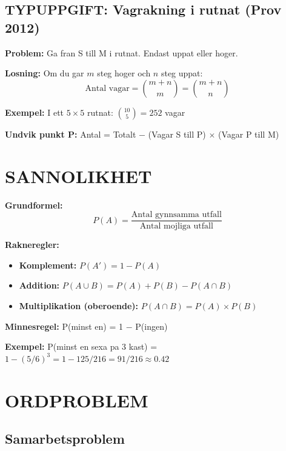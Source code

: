 \documentclass[11pt,a4paper]{article}
\newenvironment{formelbox}{\begin{framed}\color{mainblue}}{\end{framed}}
\begin{document}
\subsection{TYPUPPGIFT: Vagrakning i rutnat (Prov 2012)}

\textbf{Problem:} Ga fran S till M i rutnat. Endast uppat eller hoger.

\begin{formelbox}
\textbf{Losning:} Om du gar $m$ steg hoger och $n$ steg uppat:
\[ \text{Antal vagar} = \binom{m+n}{m} = \binom{m+n}{n} \]
\end{formelbox}

\textbf{Exempel:} I ett $5 \times 5$ rutnat: $\binom{10}{5} = 252$ vagar

\textbf{Undvik punkt P:} Antal = Totalt $-$ (Vagar S till P) $\times$ (Vagar P till M)

\section{SANNOLIKHET}

\begin{formelbox}
\textbf{Grundformel:}
\[ P(A) = \frac{\text{Antal gynnsamma utfall}}{\text{Antal mojliga utfall}} \]
\end{formelbox}

\textbf{Rakneregler:}
\begin{itemize}
\item \textbf{Komplement:} $P(A') = 1 - P(A)$
\item \textbf{Addition:} $P(A \cup B) = P(A) + P(B) - P(A \cap B)$
\item \textbf{Multiplikation (oberoende):} $P(A \cap B) = P(A) \times P(B)$
\end{itemize}

\begin{formelbox}
\textbf{Minnesregel:} P(minst en) = 1 $-$ P(ingen)
\end{formelbox}

\textbf{Exempel:} P(minst en sexa pa 3 kast) = $1 - (5/6)^3 = 1 - 125/216 = 91/216 \approx 0.42$

\section{ORDPROBLEM}

\subsection{Samarbetsproblem}
\end{document}
